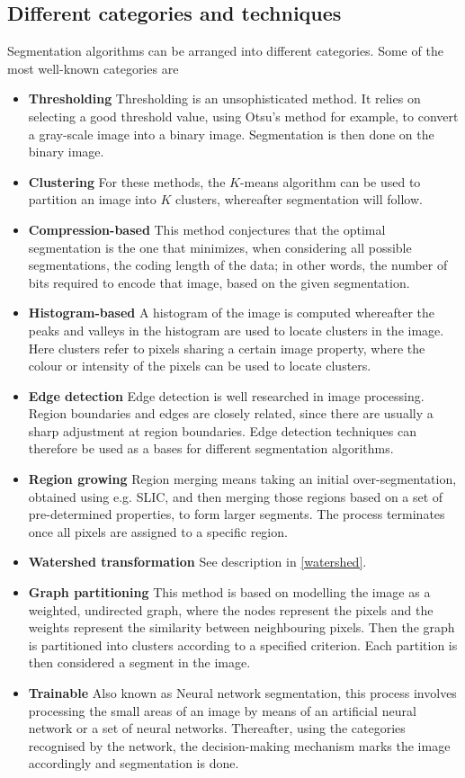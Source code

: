 \documentclass[a4paper,10pt]{article}
\begin{document}
\subsection{Different categories and techniques}
Segmentation algorithms can be arranged into different categories. 
Some of the most well-known categories are
\begin{itemize}
 \item \textbf{Thresholding}\cite{threshold}  Thresholding is an unsophisticated method. It
relies on
     selecting a good threshold
     value, using Otsu's method for example, to convert a gray-scale image into
a binary image.  Segmentation is
     then done on the binary image. 
 \item \textbf{Clustering} For these methods, the $K$-means algorithm
can be used to partition an image into $K$ clusters, whereafter
segmentation will follow.
 \item \textbf{Compression-based}\cite{compression} This method conjectures that the
optimal segmentation is the one that minimizes, when considering all possible
segmentations, the coding length of the data; in other words, the number of bits
required to encode that image, based on the given segmentation.
 \item \textbf{Histogram-based}\cite{threshold}  A histogram of 
the image is computed whereafter the peaks and valleys in the histogram
are used to locate clusters in the image.  Here clusters refer to pixels
sharing a certain image property, where the colour or intensity of the pixels can be used
to
locate clusters.
 \item \textbf{Edge detection}\cite{edge} Edge detection is well researched in image
processing.  Region boundaries and edges are closely related,
since there are usually a sharp adjustment at region boundaries.  Edge detection
techniques can therefore be used as a bases for different segmentation
algorithms.
 \item \textbf{Region growing}\cite{threshold} Region merging means taking an initial 
 over-segmentation,
obtained using e.g. SLIC, and then merging those regions based on a set of
pre-determined properties, to form larger segments.  The process
terminates once all pixels are assigned to a specific region.  
 \item \textbf{Watershed transformation} See description in \ref{watershed}.    
 \item \textbf{Graph partitioning}\cite{rw} This method is based on modelling
the image as a weighted, undirected graph, where the nodes represent the pixels
and the weights represent the similarity between neighbouring pixels. Then the
graph is partitioned into clusters according to a specified criterion.  Each
partition is then considered a segment in the image.
 \item \textbf{Trainable}\cite{trainable} Also known as Neural network segmentation,
this process involves processing the small areas of an image by means of an
artificial neural network or a set of neural networks.  Thereafter, using the
categories recognised by the network, the decision-making mechanism marks the
image accordingly and segmentation is done.
\end{itemize}
\end{document}
